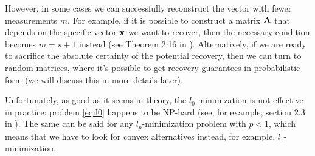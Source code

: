 \begin{remark}
    However, in some cases we can successfully reconstruct the vector with fewer measurements $m$.
    For example, if it is possible to construct a matrix $\mathbf{A}$ that depends on the specific vector $\mathbf{x}$ we want to recover,
    then the necessary condition becomes $m=s+1$ instead (see Theorem 2.16 in \cite{mathintro}).
    Alternatively, if we are ready to sacrifice the absolute certainty of the potential recovery, then
    we can turn to random matrices, where it's possible to get recovery guarantees in probabilistic form (we will discuss this in
    more details later).
\end{remark}


Unfortunately, as good as it seems in theory, the $l_0$-minimization is not effective in practice: problem \ref{eq:l0} happens to be NP-hard
(see, for example, section 2.3 in \cite{mathintro}).
The same can be said for any $l_p$-minimization problem with $p<1$, which means that we have to look for convex alternatives instead,
for example, $l_1$-minimization.